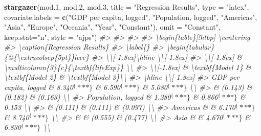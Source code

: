 \documentclass[]{book}
\newenvironment{Shaded}{\begin{snugshade}}{\end{snugshade}}
\newcommand{\KeywordTok}[1]{\textcolor[rgb]{0.13,0.29,0.53}{\textbf{#1}}}
\newcommand{\DataTypeTok}[1]{\textcolor[rgb]{0.13,0.29,0.53}{#1}}
\newcommand{\DecValTok}[1]{\textcolor[rgb]{0.00,0.00,0.81}{#1}}
\newcommand{\StringTok}[1]{\textcolor[rgb]{0.31,0.60,0.02}{#1}}
\newcommand{\CommentTok}[1]{\textcolor[rgb]{0.56,0.35,0.01}{\textit{#1}}}
\newcommand{\NormalTok}[1]{#1}
\begin{document}
\begin{Shaded}
\begin{Highlighting}[]
\KeywordTok{stargazer}\NormalTok{(mod.}\DecValTok{1}\NormalTok{, mod.}\DecValTok{2}\NormalTok{, mod.}\DecValTok{3}\NormalTok{, }\DataTypeTok{title =} \StringTok{"Regression Results"}\NormalTok{, }\DataTypeTok{type =} \StringTok{"latex"}\NormalTok{, }
          \DataTypeTok{covariate.labels  =} \KeywordTok{c}\NormalTok{(}\StringTok{"GDP per capita, logged"}\NormalTok{, }\StringTok{"Population, logged"}\NormalTok{, }\StringTok{"Americas"}\NormalTok{, }\StringTok{"Asia"}\NormalTok{, }\StringTok{"Europe"}\NormalTok{, }\StringTok{"Oceania"}\NormalTok{, }\StringTok{"Year"}\NormalTok{, }\StringTok{"Constant"}\NormalTok{), }
          \DataTypeTok{omit =} \StringTok{"Constant"}\NormalTok{, }
          \DataTypeTok{keep.stat=}\StringTok{"n"}\NormalTok{, }\DataTypeTok{style =} \StringTok{"ajps"}\NormalTok{)}
\CommentTok{#> }
\CommentTok{#> %
\CommentTok{#> %
\CommentTok{#> \textbackslash{}begin\{table\}[!htbp] \textbackslash{}centering }
\CommentTok{#>   \textbackslash{}caption\{Regression Results\} }
\CommentTok{#>   \textbackslash{}label\{\} }
\CommentTok{#> \textbackslash{}begin\{tabular\}\{@\{\textbackslash{}extracolsep\{5pt\}\}lccc\} }
\CommentTok{#> \textbackslash{}\textbackslash{}[-1.8ex]\textbackslash{}hline \textbackslash{}\textbackslash{}[-1.8ex] }
\CommentTok{#> \textbackslash{}\textbackslash{}[-1.8ex] & \textbackslash{}multicolumn\{3\}\{c\}\{\textbackslash{}textbf\{lifeExp\}\} \textbackslash{}\textbackslash{} }
\CommentTok{#> \textbackslash{}\textbackslash{}[-1.8ex] & \textbackslash{}textbf\{Model 1\} & \textbackslash{}textbf\{Model 2\} & \textbackslash{}textbf\{Model 3\}\textbackslash{}\textbackslash{} }
\CommentTok{#> \textbackslash{}hline \textbackslash{}\textbackslash{}[-1.8ex] }
\CommentTok{#>  GDP per capita, logged & 8.340$^\{***\}$ & 6.590$^\{***\}$ & 5.080$^\{***\}$ \textbackslash{}\textbackslash{} }
\CommentTok{#>   & (0.143) & (0.182) & (0.163) \textbackslash{}\textbackslash{} }
\CommentTok{#>   Population, logged & 1.280$^\{***\}$ & 0.866$^\{***\}$ & 0.153 \textbackslash{}\textbackslash{} }
\CommentTok{#>   & (0.111) & (0.111) & (0.097) \textbackslash{}\textbackslash{} }
\CommentTok{#>   Americas &  & 6.170$^\{***\}$ & 8.740$^\{***\}$ \textbackslash{}\textbackslash{} }
\CommentTok{#>   &  & (0.555) & (0.477) \textbackslash{}\textbackslash{} }
\CommentTok{#>   Asia &  & 4.670$^\{***\}$ & 6.830$^\{***\}$ \textbackslash{}\textbackslash{} }
}}
\end{Highlighting}
\end{Shaded}
\end{document}
